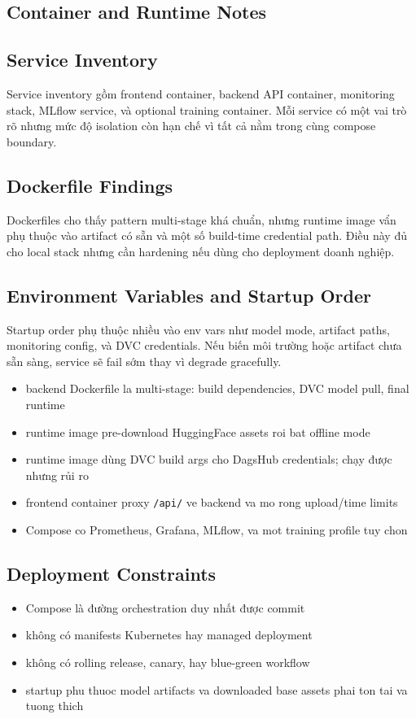 \subsection{Container and Runtime Notes}
\subsection{Service Inventory}
Service inventory gồm frontend container, backend API container, monitoring stack, MLflow service, và optional training container. Mỗi service có một vai trò rõ nhưng mức độ isolation còn hạn chế vì tất cả nằm trong cùng compose boundary.

\subsection{Dockerfile Findings}
Dockerfiles cho thấy pattern multi-stage khá chuẩn, nhưng runtime image vẩn phụ thuộc vào artifact có sẵn và một số build-time credential path. Điều này đủ cho local stack nhưng cần hardening nếu dùng cho deployment doanh nghiệp.

\subsection{Environment Variables and Startup Order}
Startup order phụ thuộc nhiều vào env vars như model mode, artifact paths, monitoring config, và DVC credentials. Nếu biến môi trường hoặc artifact chưa sẵn sàng, service sẽ fail sớm thay vì degrade gracefully.

\begin{itemize}[leftmargin=1.2em]
  \item backend Dockerfile la multi-stage: build dependencies, DVC model pull, final runtime
  \item runtime image pre-download HuggingFace assets roi bat offline mode
  \item runtime image dùng DVC build args cho DagsHub credentials; chạy được nhưng rủi ro
  \item frontend container proxy \texttt{/api/} ve backend va mo rong upload/time limits
  \item Compose co Prometheus, Grafana, MLflow, va mot training profile tuy chon
\end{itemize}

\subsection{Deployment Constraints}
\begin{itemize}[leftmargin=1.2em]
  \item Compose là đường orchestration duy nhất được commit
  \item không có manifests Kubernetes hay managed deployment
  \item không có rolling release, canary, hay blue-green workflow
  \item startup phu thuoc model artifacts va downloaded base assets phai ton tai va tuong thich
\end{itemize}

